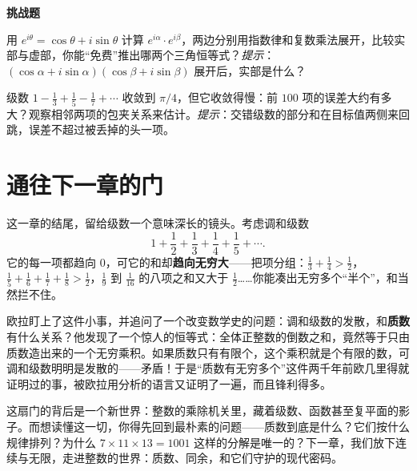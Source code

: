 \textbf{挑战题}
\begin{sikao}
  \setcounter{sikaoi}{4}
  \item 用 $e^{i\theta}=\cos\theta+i\sin\theta$ 计算 $e^{i\alpha}\cdot e^{i\beta}$，两边分别用指数律和复数乘法展开，比较实部与虚部，你能“免费”推出哪两个三角恒等式？\emph{提示}：$(\cos\alpha+i\sin\alpha)(\cos\beta+i\sin\beta)$ 展开后，实部是什么？
  \item 级数 $1-\frac13+\frac15-\frac17+\cdots$ 收敛到 $\pi/4$，但它收敛得慢：前 $100$ 项的误差大约有多大？观察相邻两项的包夹关系来估计。\emph{提示}：交错级数的部分和在目标值两侧来回跳，误差不超过被丢掉的头一项。
\end{sikao}

\section*{通往下一章的门}

这一章的结尾，留给级数一个意味深长的镜头。考虑调和级数
\[
1+\frac12+\frac13+\frac14+\frac15+\cdots .
\]
它的每一项都趋向 $0$，可它的和却\textbf{趋向无穷大}——把项分组：$\frac13+\frac14>\frac12$，$\frac15+\frac16+\frac17+\frac18>\frac12$，$\frac19$ 到 $\frac1{16}$ 的八项之和又大于 $\frac12$……你能凑出无穷多个“半个”，和当然拦不住。

欧拉盯上了这件小事，并追问了一个改变数学史的问题：调和级数的发散，和\textbf{质数}有什么关系？他发现了一个惊人的恒等式：全体正整数的倒数之和，竟然等于只由质数造出来的一个无穷乘积。如果质数只有有限个，这个乘积就是个有限的数，可调和级数明明是发散的——矛盾！于是“质数有无穷多个”这件两千年前欧几里得就证明过的事，被欧拉用分析的语言又证明了一遍，而且锋利得多。

这扇门的背后是一个新世界：整数的乘除机关里，藏着级数、函数甚至复平面的影子。而想读懂这一切，你得先回到最朴素的问题——质数到底是什么？它们按什么规律排列？为什么 $7\times 11\times 13=1001$ 这样的分解是唯一的？下一章，我们放下连续与无限，走进整数的世界：质数、同余，和它们守护的现代密码。
